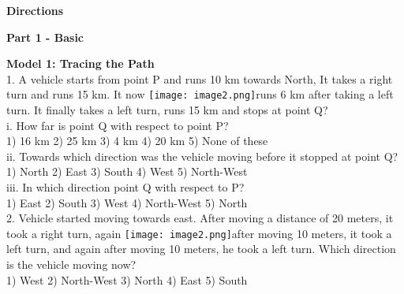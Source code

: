 \documentclass[
]{article}
\author{}
\date{}
\begin{document}
	
 

\begin{center}
	{\Large \textbf{Directions \\}}
\end{center}

{\large \textbf{Part 1 - Basic  \\}}

\textbf{Model 1: Tracing the Path}\\

1. A vehicle starts from point P and runs 10 km towards North, It takes a right turn and runs 15 km. It now \texttt{[image: image2.png]}runs 6 km after taking a left turn. It finally takes a left turn, runs 15 km and
stops at point Q?\\
i. How far is point Q with respect to point P?\\
1) 16 km \hspace{2mm}2) 25 km \hspace{2mm}3) 4 km \hspace{2mm}4) 20 km \hspace{2mm}5) None of these\\

ii. Towards which direction was the vehicle moving before it stopped at point Q?\\
1) North \hspace{2mm}2) East \hspace{2mm}3) South \hspace{2mm}4) West \hspace{2mm}5) North-West\\

iii. In which direction point Q with respect to P?\\
1) East \hspace{2mm}2) South \hspace{2mm}3) West \hspace{2mm}4) North-West \hspace{2mm}5) North\\

2. Vehicle started moving towards east. After moving a distance of 20 meters, it took a right turn, again \texttt{[image: image2.png]}after moving 10 meters, it took a left turn, and again after moving 10 meters, he took a left turn. Which direction is the vehicle moving now?\\
1) West \hspace{2mm}2) North-West \hspace{2mm}3) North \hspace{2mm}4) East \hspace{2mm}5) South\\
\end{document}
